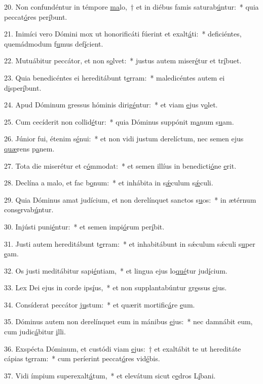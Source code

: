 20. Non confundéntur in témpore \uline{ma}lo,~† et in diébus famis saturab\uline{ú}ntur:~* quia peccat\uline{ó}res per\uline{í}bunt.\par 
21. Inimíci vero Dómini mox ut honorificáti fúerint et exalt\uline{á}ti:~* deficiéntes, quemádmodum f\uline{u}mus def\uline{í}cient.\par 
22. Mutuábitur peccátor, et non s\uline{o}lvet:~* justus autem miser\uline{é}tur et tr\uline{í}buet.\par 
23. Quia benedicéntes ei hereditábunt t\uline{e}rram:~* maledicéntes autem ei d\uline{i}sper\uline{í}bunt.\par 
24. Apud Dóminum gressus hóminis dirig\uline{é}ntur:~* et viam \uline{e}jus v\uline{o}let.\par 
25. Cum cecíderit non collid\uline{é}tur:~* quia Dóminus suppónit m\uline{a}num s\uline{u}am.\par 
26. Júnior fui, étenim s\uline{é}nui:~* et non vidi justum derelíctum, nec semen ejus \uline{quæ}rens p\uline{a}nem.\par 
27. Tota die miserétur et c\uline{ó}mmodat:~* et semen illíus in benedicti\uline{ó}ne \uline{e}rit.\par 
28. Declína a malo, et fac b\uline{o}num:~* et inhábita in s\uline{ǽ}culum s\uline{ǽ}culi.\par 
29. Quia Dóminus amat judícium, et non derelínquet sanctos s\uline{u}os:~* in ætérnum cons\uline{e}rvab\uline{ú}ntur.\par 
30. Injústi puni\uline{é}ntur:~* et semen impi\uline{ó}rum per\uline{í}bit.\par 
31. Justi autem hereditábunt t\uline{e}rram:~* et inhabitábunt in sǽculum sǽculi s\uline{u}per \uline{e}am.\par 
32. Os justi meditábitur sapi\uline{é}ntiam,~* et lingua ejus lo\uline{qué}tur jud\uline{í}cium.\par 
33. Lex Dei ejus in corde ips\uline{í}us,~* et non supplantabúntur gr\uline{e}ssus \uline{e}jus.\par 
34. Consíderat peccátor j\uline{u}stum:~* et quærit mortific\uline{á}re \uline{e}um.\par 
35. Dóminus autem non derelínquet eum in mánibus \uline{e}jus:~* nec damnábit eum, cum judic\uline{á}bitur \uline{i}lli.\par 
36. Exspécta Dóminum, et custódi viam \uline{e}jus:~† et exaltábit te ut hereditáte cápias t\uline{e}rram:~* cum períerint peccat\uline{ó}res vid\uline{é}bis.\par 
37. Vidi ímpium superexalt\uline{á}tum,~* et elevátum sicut c\uline{e}dros L\uline{í}bani.\par 
